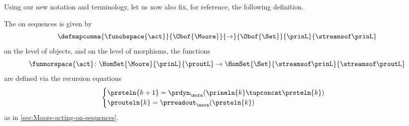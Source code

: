 {Using our new notation and terminology, let us now also fix, for reference, the following definition.

\begin{definition}
    \label{def:moore-standard-action-on-sequences}
    The  on sequences is given by
    \begin{equation}
        \defmapcomma{\funobspace{\act}}
        {\Obof{\Moore}}
        {\to}
        {\Obof{\Set}}
        {\prinL}
        {\streamsof\prinL}
    \end{equation}
    on the level of objects, and on the level of morphisms, the functions
    \begin{equation}
        \funmorspace{\act} \colon \HomSet{\Moore}{\prinL}{\proutL} \to \HomSet{\Set}{\streamsof\prinL }{\streamsof\proutL}
    \end{equation}
    are defined via the recursion equations
    \begin{equation}
        \begin{cases}
            \prsteln{k+1} = \prdyn_\mora(\prineln{k} \tupconcat \prsteln{k}) \\
            \prouteln{k} = \prreadout_\mora(\prsteln{k})
        \end{cases}
    \end{equation}
    as in \cref{sec:Moore-acting-on-sequences}.
\end{definition}
}
